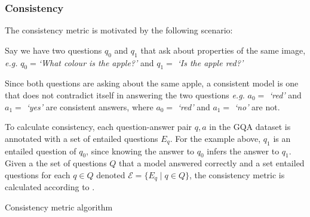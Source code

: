 \subsubsection{Consistency}

The consistency metric is motivated by the following scenario:

Say we have two questions \(q_0\) and \(q_1\) that ask about properties of the same image, \textit{e.g.} \(q_0 = \)\textit{`What colour is the apple?'} and  \(q_1 = \) \textit{`Is the apple red?'}

Since both questions are asking about the same apple, a consistent model is one that does not contradict itself in answering the two questions \textit{e.g.} \(a_0 =\) \textit{`red'} and \(a_1 =\) \textit{`yes'} are consistent answers, where \(a_0 =\) \textit{`red'} and \(a_1 =\) \textit{`no'} are not.

To calculate consistency, each question-answer pair \(q, a\) in the GQA dataset is annotated with a set of entailed questions \(E_q\). For the example above, \(q_1\) is an entailed question of \(q_0\), since knowing the answer to \(q_0\) infers the answer to \(q_1\). Given a the set of questions \(Q\) that a model answered correctly and a set entailed questions for each \(q \in Q\) denoted \(\mathcal{E} = \{E_q \mid q \in Q\}\), the consistency metric is calculated according to \algorithmcfname{ \ref{algorithm:consistency}}.

\begin{algorithm}[htbp]
    \caption[Consistency metric algorithm.]{Consistency metric algorithm}
    \label{algorithm:consistency}
\end{algorithm}


